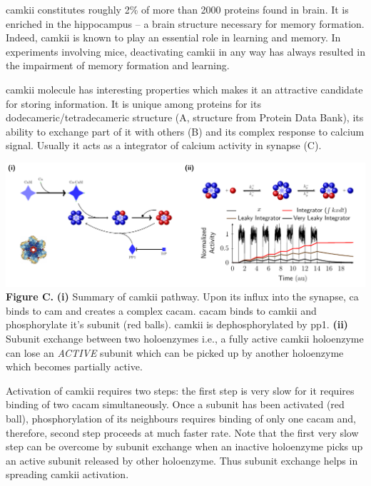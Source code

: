 \documentclass[]{resonance}
\begin{document}
 {

    \gls{camkii} constitutes roughly 2\% of more than 2000 proteins found in
    brain. It is enriched in the hippocampus -- a brain structure necessary for
    memory formation. Indeed, \gls{camkii} is known to play an essential role in
    learning and memory. In experiments involving mice, deactivating
    \gls{camkii} in any way has always resulted in the impairment of memory
    formation and learning. 

    \gls{camkii} molecule has interesting properties which makes it an
    attractive candidate for storing information. It is unique among proteins
    for its dodecameric/tetradecameric structure (A, structure from Protein Data Bank),
    its ability to exchange part of it with others (B) and its complex response
    to calcium signal.  Usually it acts as a integrator of calcium activity in
    synapse (C).

    \vspace{2mm}
    \includegraphics[width=0.9\linewidth]{./camkii_properties.pdf} \\
    \textbf{Figure C.} \textbf{(i)} Summary of \gls{camkii} pathway. Upon its influx into
    the synapse, \gls{ca} binds to \gls{cam} and creates a complex \gls{cacam}.
    \gls{cacam} binds to \gls{camkii} and phosphorylate it's subunit (red
    balls). \gls{camkii} is dephosphorylated by \gls{pp1}. \textbf{(ii)} Subunit
    exchange between two holoenzymes i.e., a fully active \gls{camkii} holoenzyme
    can lose an \textit{ACTIVE} subunit which can be picked up by another
    holoenzyme which becomes partially active. 
    
    \vspace{2mm}
    Activation of \gls{camkii} requires two steps: the first step is very slow
    for it requires binding of two \gls{cacam} simultaneously. Once a subunit
    has been activated (red ball), phosphorylation of its neighbours requires
    binding of only one \gls{cacam} and, therefore, second step proceeds at  much
    faster rate.  Note that the first very slow step can be overcome by subunit
    exchange when an inactive holoenzyme picks up an active subunit released by
    other holoenzyme. Thus subunit exchange helps in spreading \gls{camkii}
    activation. 

}
\end{document}
